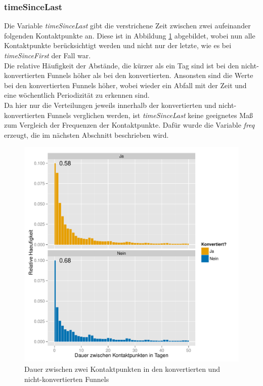 \subsubsection*{timeSinceLast}
Die Variable \textit{timeSinceLast} gibt die verstrichene Zeit zwischen zwei aufeinander folgenden Kontaktpunkte an. Diese ist in Abbildung \ref{timeSinceLast} abgebildet, wobei nun alle Kontaktpunkte berücksichtigt werden und nicht nur der letzte, wie es bei \textit{timeSinceFirst} der Fall war.\\
Die relative Häufigkeit der Abstände, die kürzer als ein Tag sind ist bei den nicht-konvertierten Funnels höher als bei den konvertierten. Ansonsten sind die Werte bei den konvertierten Funnels höher, wobei wieder ein Abfall mit der Zeit und eine wöchentlich Periodizität zu erkennen sind.\\
Da hier nur die Verteilungen jeweils innerhalb der konvertierten und nicht-konvertierten Funnels verglichen werden, ist \textit{timeSinceLast} keine geeignetes Maß zum Vergleich der Frequenzen der Kontaktpunkte. Dafür wurde die Variable \textit{freq} erzeugt, die im nächsten Abschnitt beschrieben wird.
\begin{figure}[H]
    \centering
    \includegraphics[scale=0.6]{timeSinceLast.pdf}
    \caption[Dauer zwischen zwei Kontaktpunkten]{Dauer zwischen zwei Kontaktpunkten in den konvertierten und nicht-konvertierten Funnels}
    \label{timeSinceLast}
\end{figure}


